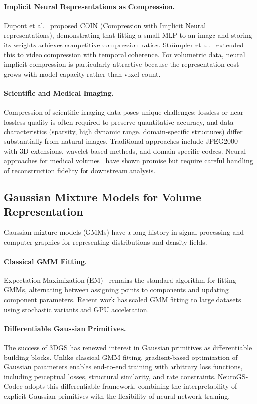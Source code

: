 \documentclass[11pt,a4paper]{article}
\begin{document}
\paragraph{Implicit Neural Representations as Compression.}
Dupont et al.~\cite{dupont2021coin} proposed COIN (Compression with Implicit Neural representations), demonstrating that fitting a small MLP to an image and storing its weights achieves competitive compression ratios. Str\"umpler et al.~\cite{strumpler2022implicit} extended this to video compression with temporal coherence. For volumetric data, neural implicit compression is particularly attractive because the representation cost grows with model capacity rather than voxel count.

\paragraph{Scientific and Medical Imaging.}
Compression of scientific imaging data poses unique challenges: lossless or near-lossless quality is often required to preserve quantitative accuracy, and data characteristics (sparsity, high dynamic range, domain-specific structures) differ substantially from natural images. Traditional approaches include JPEG2000~\cite{taubman2002jpeg2000} with 3D extensions, wavelet-based methods, and domain-specific codecs. Neural approaches for medical volumes~\cite{yang2023implicitvol,chen2023neurocompress} have shown promise but require careful handling of reconstruction fidelity for downstream analysis.

\subsection{Gaussian Mixture Models for Volume Representation}

Gaussian mixture models (GMMs) have a long history in signal processing and computer graphics for representing distributions and density fields.

\paragraph{Classical GMM Fitting.}
Expectation-Maximization (EM)~\cite{dempster1977maximum} remains the standard algorithm for fitting GMMs, alternating between assigning points to components and updating component parameters. Recent work has scaled GMM fitting to large datasets using stochastic variants and GPU acceleration.

\paragraph{Differentiable Gaussian Primitives.}
The success of 3DGS has renewed interest in Gaussian primitives as differentiable building blocks. Unlike classical GMM fitting, gradient-based optimization of Gaussian parameters enables end-to-end training with arbitrary loss functions, including perceptual losses, structural similarity, and rate constraints. NeuroGS-Codec adopts this differentiable framework, combining the interpretability of explicit Gaussian primitives with the flexibility of neural network training.
\end{document}
